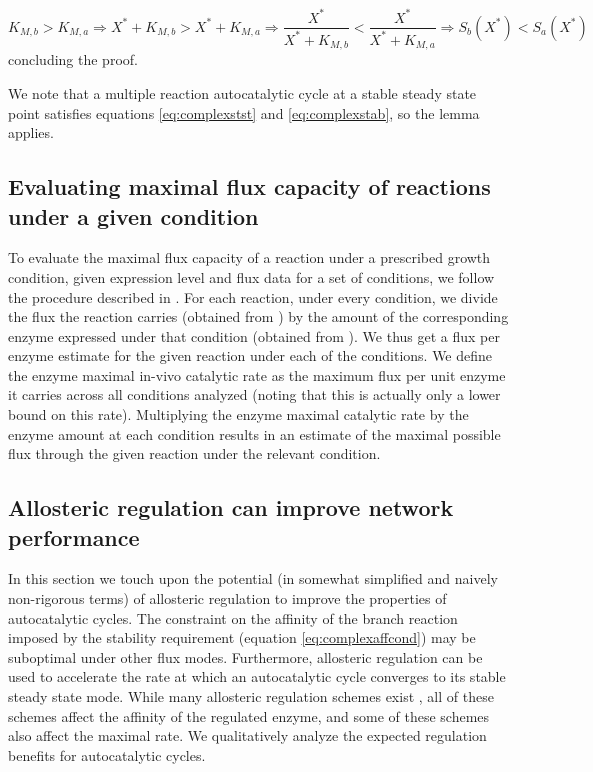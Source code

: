     \begin{equation*}
        K_{M,b}>K_{M,a} \Rightarrow X^*+K_{M,b}>X^*+K_{M,a} \Rightarrow \frac{X^*}{X^*+K_{M,b}}<\frac{X^*}{X^*+K_{M,a} } \Rightarrow S_b(X^*)<S_a(X^*)
    \end{equation*}
    concluding the proof.

    We note that a multiple reaction autocatalytic cycle at a stable steady state point satisfies equations \ref{eq:complexstst} and \ref{eq:complexstab}, so the lemma applies.

  \label{sec:complexderivativesaturationrelation}
    \subsection{Evaluating maximal flux capacity of reactions under a given condition}
    To evaluate the maximal flux capacity of a reaction under a prescribed growth condition, given expression level and flux data for a set of conditions, we follow the procedure described in \cite{Davidi2016-ga}.
    For each reaction, under every condition, we divide the flux the reaction carries (obtained from \cite{Gerosa2015-oq}) by the amount of the corresponding enzyme expressed under that condition (obtained from \cite{Schmidt2015}).
    We thus get a flux per enzyme estimate for the given reaction under each of the conditions.
    We define the enzyme maximal in-vivo catalytic rate as the maximum flux per unit enzyme it carries across all conditions analyzed (noting that this is actually only a lower bound on this rate).
    Multiplying the enzyme maximal catalytic rate by the enzyme amount at each condition results in an estimate of the maximal possible flux through the given reaction under the relevant condition.

  \label{sec:calcsat}
    \subsection{Allosteric regulation can improve network performance}
    In this section we touch upon the potential (in somewhat simplified and naively non-rigorous terms) of allosteric regulation to improve the properties of autocatalytic cycles.
    The constraint on the affinity of the branch reaction imposed by the stability requirement (equation \ref{eq:complexaffcond}) may be suboptimal under other flux modes.
    Furthermore, allosteric regulation can be used to accelerate the rate at which an autocatalytic cycle converges to its stable steady state mode.
    While many allosteric regulation schemes exist \cite{Leskovac2003-li}, all of these schemes affect the affinity of the regulated enzyme, and some of these schemes also affect the maximal rate.
    We qualitatively analyze the expected regulation benefits for autocatalytic cycles.

